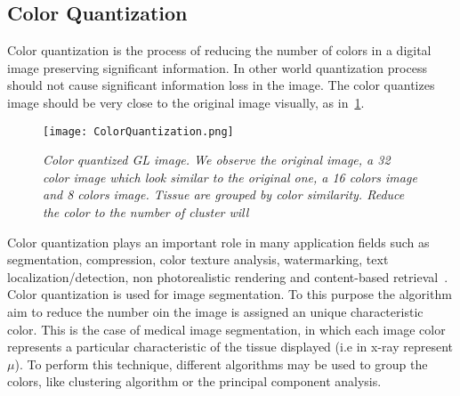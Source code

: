 \documentclass{standalone}
\begin{document}
	\subsection{Color Quantization}
	

	Color quantization is the process of reducing the number of colors in a digital image preserving significant information. In other world quantization process should not cause significant information loss in the image.  The color quantizes image should be very close to the original image visually, as in \figurename\,\ref{fig:ColorQuantization}. 

	\begin{figure}[h!]
		
		\centering
			\texttt{[image: ColorQuantization.png]}
		\caption{\textit{Color quantized GL image. We observe the original image, a 32 color image which look similar to the original one, a 16 colors image and 8 colors image. Tissue are grouped by color similarity. Reduce the color to the number of cluster will }}\label{fig:ColorQuantization}
	\end{figure}

	Color quantization plays an important role in many application fields such as segmentation, compression, color texture analysis, watermarking, 
	text localization/detection, non photorealistic rendering and content-based retrieval~\cite{ART:Ozturk}.\\
	
	
	Color quantization is used for image segmentation. To this purpose the algorithm aim to reduce the number oin the image is assigned an unique characteristic color. This is the case of medical image segmentation, in which each image color represents a particular characteristic of the tissue displayed (i.e in x-ray represent$\mu$). 
	To perform this technique, different algorithms may be used to group the colors, like clustering algorithm or the principal component analysis.


	
	
	
	

	
	
\end{document}
